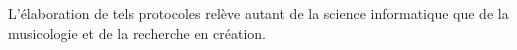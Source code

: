 
L'élaboration de tels protocoles relève autant de la science informatique que de la musicologie et de la recherche en création.








